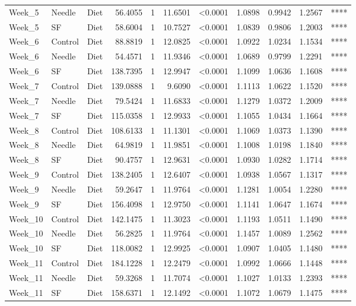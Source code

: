 \documentclass[
  12pt,
  letterpaper,
]{article}
\begin{document}
\begin{longtable}{lllrrrlrrrc}
Week\_5 & Needle & Diet & 56.4055 & 1 & 11.6501 & <0.0001 & 1.0898 & 0.9942 & 1.2567 & **** \\ 
Week\_5 & SF & Diet & 58.6004 & 1 & 10.7527 & <0.0001 & 1.0839 & 0.9806 & 1.2003 & **** \\ 
Week\_6 & Control & Diet & 88.8819 & 1 & 12.0825 & <0.0001 & 1.0922 & 1.0234 & 1.1534 & **** \\ 
Week\_6 & Needle & Diet & 54.4571 & 1 & 11.9346 & <0.0001 & 1.0689 & 0.9799 & 1.2291 & **** \\ 
Week\_6 & SF & Diet & 138.7395 & 1 & 12.9947 & <0.0001 & 1.1099 & 1.0636 & 1.1608 & **** \\ 
Week\_7 & Control & Diet & 139.0888 & 1 & 9.6090 & <0.0001 & 1.1113 & 1.0622 & 1.1520 & **** \\ 
Week\_7 & Needle & Diet & 79.5424 & 1 & 11.6833 & <0.0001 & 1.1279 & 1.0372 & 1.2009 & **** \\ 
Week\_7 & SF & Diet & 115.0358 & 1 & 12.9933 & <0.0001 & 1.1055 & 1.0434 & 1.1664 & **** \\ 
Week\_8 & Control & Diet & 108.6133 & 1 & 11.1301 & <0.0001 & 1.1069 & 1.0373 & 1.1390 & **** \\ 
Week\_8 & Needle & Diet & 64.9819 & 1 & 11.9851 & <0.0001 & 1.1008 & 1.0198 & 1.1840 & **** \\ 
Week\_8 & SF & Diet & 90.4757 & 1 & 12.9631 & <0.0001 & 1.0930 & 1.0282 & 1.1714 & **** \\ 
Week\_9 & Control & Diet & 138.2405 & 1 & 12.6407 & <0.0001 & 1.0938 & 1.0567 & 1.1317 & **** \\ 
Week\_9 & Needle & Diet & 59.2647 & 1 & 11.9764 & <0.0001 & 1.1281 & 1.0054 & 1.2280 & **** \\ 
Week\_9 & SF & Diet & 156.4098 & 1 & 12.9750 & <0.0001 & 1.1141 & 1.0647 & 1.1674 & **** \\ 
Week\_10 & Control & Diet & 142.1475 & 1 & 11.3023 & <0.0001 & 1.1193 & 1.0511 & 1.1490 & **** \\ 
Week\_10 & Needle & Diet & 56.2825 & 1 & 11.9764 & <0.0001 & 1.1457 & 1.0089 & 1.2562 & **** \\ 
Week\_10 & SF & Diet & 118.0082 & 1 & 12.9925 & <0.0001 & 1.0907 & 1.0405 & 1.1480 & **** \\ 
Week\_11 & Control & Diet & 184.1228 & 1 & 12.2479 & <0.0001 & 1.0992 & 1.0666 & 1.1448 & **** \\ 
Week\_11 & Needle & Diet & 59.3268 & 1 & 11.7074 & <0.0001 & 1.1027 & 1.0133 & 1.2393 & **** \\ 
Week\_11 & SF & Diet & 158.6371 & 1 & 12.1492 & <0.0001 & 1.1072 & 1.0679 & 1.1475 & **** \\ 

\end{longtable}
\end{document}
